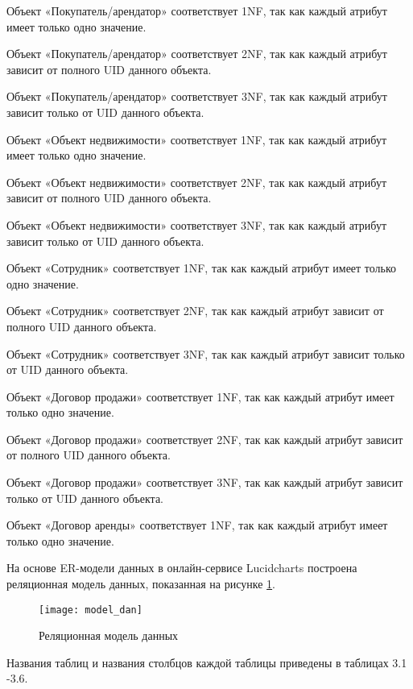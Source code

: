Объект «Покупатель/арендатор» соответствует 1NF, так как каждый атрибут имеет только одно значение.

Объект «Покупатель/арендатор» соответствует 2NF, так как каждый атрибут зависит от полного UID данного объекта.

Объект «Покупатель/арендатор» соответствует 3NF, так как каждый атрибут зависит только от UID данного объекта.

Объект «Объект недвижимости» соответствует 1NF, так как каждый атрибут имеет только одно значение.

Объект «Объект недвижимости» соответствует 2NF, так как каждый атрибут зависит от полного UID данного объекта.

Объект «Объект недвижимости» соответствует 3NF, так как каждый атрибут зависит только от UID данного объекта.

Объект «Сотрудник» соответствует 1NF, так как каждый атрибут имеет только одно значение.

Объект «Сотрудник» соответствует 2NF, так как каждый атрибут зависит от полного UID данного объекта.

Объект «Сотрудник» соответствует 3NF, так как каждый атрибут зависит только от UID данного объекта.

Объект «Договор продажи» соответствует 1NF, так как каждый атрибут имеет только одно значение.

Объект «Договор продажи» соответствует 2NF, так как каждый атрибут зависит от полного UID данного объекта.

Объект «Договор продажи» соответствует 3NF, так как каждый атрибут зависит только от UID данного объекта.

Объект «Договор аренды» соответствует 1NF, так как каждый атрибут имеет только одно значение.


На основе ER-модели данных в онлайн-сервисе Lucidcharts построена реляционная модель данных, показанная на рисунке \ref{exchange_scheme:image}.

\begin{figure}[H]
\texttt{[image: model\_dan]}
\caption{Реляционная модель данных}
\label{exchange_scheme:image}
\end{figure}

Названия таблиц и названия столбцов каждой таблицы приведены в таблицах 3.1 -3.6.

